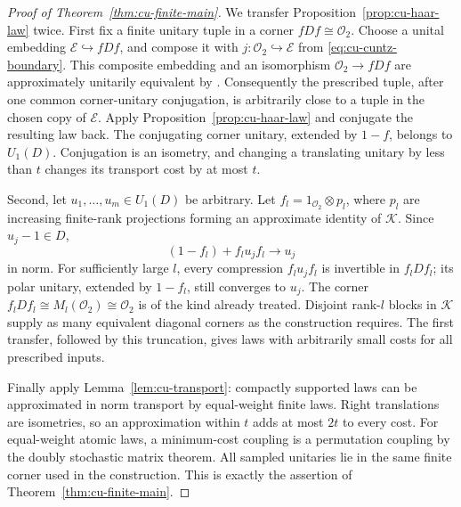 \begin{proof}[Proof of Theorem~\protect\ref{thm:cu-finite-main}]
We transfer Proposition~\ref{prop:cu-haar-law} twice. First fix a finite
unitary tuple in a corner $fDf\cong\mathcal{O}_2$. Choose a unital embedding 
$\mathcal{E}\hookrightarrow fDf$, and compose it with $j:\mathcal{O}_2\hookrightarrow\mathcal{E}$ from \eqref{eq:cu-cuntz-boundary}. This composite
embedding and an isomorphism $\mathcal{O}_2\to fDf$ are approximately
unitarily equivalent by \cite[Theorem 1.13]{KirchbergPhillips2000}. Consequently the prescribed
tuple, after one common corner-unitary conjugation, is arbitrarily close to
a tuple in the chosen copy of $\mathcal{E}$. Apply Proposition~\ref{prop:cu-haar-law} and conjugate the resulting law back. The conjugating corner
unitary, extended by $1-f$, belongs to $U_1(D)$. Conjugation is an isometry,
and changing a translating unitary by less than $t$ changes its transport
cost by at most $t$.

Second, let $u_1,\ldots,u_m\in U_1(D)$ be arbitrary. Let $f_l=1_{\mathcal{O}_2}\otimes p_l$, where $p_l$ are increasing finite-rank projections forming
an approximate identity of $\mathcal{K}$. Since $u_j-1\in D$, 
\begin{equation*}
(1-f_l)+f_lu_jf_l\longrightarrow u_j
\end{equation*}
in norm. For sufficiently large $l$, every compression $f_lu_jf_l$ is
invertible in $f_lDf_l$; its polar unitary, extended by $1-f_l$, still
converges to $u_j$. The corner $f_lDf_l\cong M_l(\mathcal{O}_2)\cong\mathcal{O}_2$ is of the kind already treated. Disjoint rank-$l$ blocks in $\mathcal{K}$ supply as many equivalent diagonal corners as the construction requires.
The first transfer, followed by this truncation, gives laws with arbitrarily
small costs for all prescribed inputs.

Finally apply Lemma~\ref{lem:cu-transport}: compactly supported laws can be
approximated in norm transport by equal-weight finite laws. Right
translations are isometries, so an approximation within $t$ adds at most $2t$
to every cost. For equal-weight atomic laws, a minimum-cost coupling is a
permutation coupling by the doubly stochastic matrix theorem. All sampled
unitaries lie in the same finite corner used in the construction. This is
exactly the assertion of Theorem~\ref{thm:cu-finite-main}.
\end{proof}

